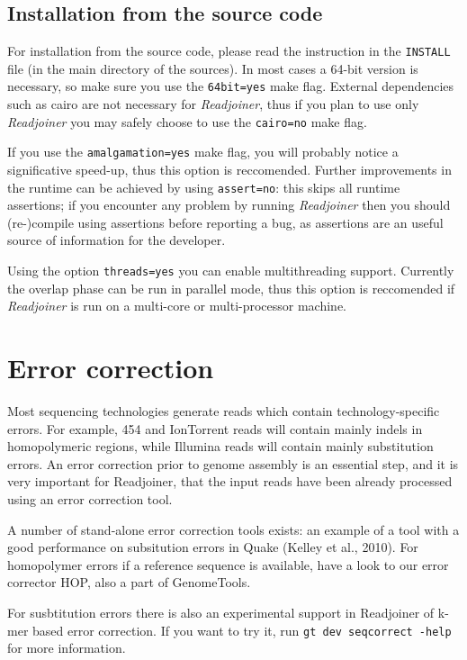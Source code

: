 \documentclass[12pt,titlepage]{article}
\newcommand{\Readjoiner}{\textit{Readjoiner}\xspace}
\begin{document}
\subsection{Installation from the source code}

For installation from the source code, please read the instruction in the
\texttt{INSTALL}
file (in the main directory of the sources). In most cases a 64-bit version
is necessary, so make sure you use the \texttt{64bit=yes} make flag.
External dependencies such as cairo are not necessary for
\Readjoiner, thus if you plan to use only \Readjoiner you may safely choose
to use the \texttt{cairo=no} make flag.

If you use the \texttt{amalgamation=yes} make flag, you will probably notice
a significative speed-up, thus this option is reccomended. Further improvements
in the runtime can be achieved by using \texttt{assert=no}: this skips all
runtime assertions; if you encounter any problem by running \Readjoiner
then you should (re-)compile using assertions before reporting a bug,
as assertions are an useful source of information for the developer.

Using the option \texttt{threads=yes} you can enable multithreading support.
Currently the overlap phase can be run in parallel mode, thus this option is
reccomended if \Readjoiner is run on a multi-core or multi-processor
machine.

\section{Error correction}

Most sequencing technologies generate reads which contain technology-specific
errors. For example, 454 and IonTorrent reads will contain mainly indels in
homopolymeric regions, while Illumina reads will contain mainly substitution
errors. An error correction prior to genome assembly is an essential step,
and it is very important for Readjoiner, that the input reads have been already
processed using an error correction tool.

A number of stand-alone error correction tools exists: an example of a tool
with a good performance on subsitution errors in Quake (Kelley et al., 2010).
For homopolymer errors if a reference sequence is available, have
a look to our error corrector HOP, also a part of GenomeTools.

For susbtitution errors there is also an experimental support in Readjoiner
of k-mer based error correction. If you want to try it,
run \texttt{gt dev seqcorrect -help} for more information.
\end{document}
